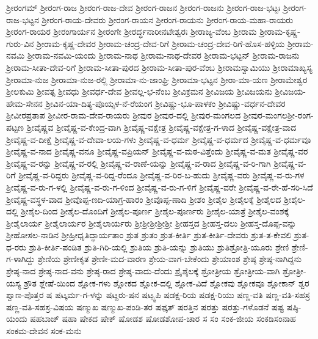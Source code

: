 ಶ್ರೀರಂಗಮ್
ಶ್ರೀರಂಗ-ರಾಜ
ಶ್ರೀರಂಗ-ರಾಜ-ದೇವ
ಶ್ರೀರಂಗ-ರಾಜನ
ಶ್ರೀರಂಗ-ರಾಜನು
ಶ್ರೀರಂಗ-ರಾಜ-ಭಟ್ಟಃ
ಶ್ರೀರಂಗ-ರಾಜ-ಭಟ್ಟನ
ಶ್ರೀರಂಗ-ರಾಯ-ದೇವರು
ಶ್ರೀರಂಗ-ರಾಯನ
ಶ್ರೀರಂಗ-ರಾಯನು
ಶ್ರೀರಂಗ-ರಾಯ-ಮಹಾ-ರಾಯರು
ಶ್ರೀರಂಗ-ರಾಯರ
ಶ್ರೀರಂಗಾರ್ಯನ
ಶ್ರೀರಂಗೇ
ಶ್ರೀರರ್ದ್ಧನಾರೀನಟೇಶ್ವರಃ
ಶ್ರೀರಾಜ್ಯ-ವೆಂಬ
ಶ್ರೀರಾಮ
ಶ್ರೀರಾಮ-ಕೃಷ್ಣ-ಗುರು-ವಿನ
ಶ್ರೀರಾಮ-ಕೃಷ್ಣ-ದೇವರ
ಶ್ರೀರಾಮ-ಚಂದ್ರ-ದೇವ-ರಿಗೆ
ಶ್ರೀರಾಮ-ಚಂದ್ರ-ದೇವ-ರಿಗೆ-ಹೊಸ-ಹಳ್ಳಿಯ
ಶ್ರೀರಾಮ-ನವಮಿ
ಶ್ರೀರಾಮ-ನವಮಿ-ಯಂದು
ಶ್ರೀರಾಮ-ನಾಥ
ಶ್ರೀರಾಮ-ನಾಥ-ದೇವರ
ಶ್ರೀರಾಮ-ಭಟ್ಟನ್
ಶ್ರೀರಾಮ-ರಾಜನು
ಶ್ರೀರಾಮ-ಸೀತಾ-ದೇವ-ರಿಗೆ
ಶ್ರೀರಾಮ-ಸೀತಾ-ಪುರದ
ಶ್ರೀರಾಮ-ಸೀತಾ-ಪುರ-ವೆಂಬ
ಶ್ರೀರಾಮಸ್ವಾಮಿಯು
ಶ್ರೀರಾಮಾಖ್ಯಸ್ಯ
ಶ್ರೀರಾಮಾ-ನುಜ
ಶ್ರೀರಾಮಾ-ನುಜ-ರಲ್ಲಿ
ಶ್ರೀರಾಮಾ-ನು-ಜಾಂಘ್ರಿ
ಶ್ರೀರಾಮಾ-ಭಟ್ಟನ
ಶ್ರೀರಾ-ಮಾ-ಯಣ
ಶ್ರೀರಾಮೇಶ್ವರ
ಶ್ರೀಲಕುಮಿ
ಶ್ರೀವತ್ಸ
ಶ್ರೀವಧು
ಶ್ರೀವರ್ಧ-ದೇವ
ಶ್ರೀವಲ್ಲ-ಭ-ನೆಂಬ
ಶ್ರೀವಿಕ್ರಮನ
ಶ್ರೀವಿಜಯ
ಶ್ರೀವಿಜಯನು
ಶ್ರೀವಿಜಯ-ಹೇಮ-ಸೇನನ
ಶ್ರೀವಿನ-ಯಾ-ದಿತ್ಯ-ಪೊಯ್ಸಳ-ನೆ-ರೆಯಂಗ
ಶ್ರೀವಿಷ್ಣು-ಭೂ-ಪಾಳಕಂ
ಶ್ರೀವಿಷ್ಣು-ವರ್ಧನ-ದೇವರ
ಶ್ರೀವೀರಪ್ರತಾಪ
ಶ್ರೀವೀರ-ರಾಮ-ದೇವ-ರಾಯರು
ಶ್ರೀವುರ
ಶ್ರೀವುರ-ದಲ್ಲಿ
ಶ್ರೀವುರ-ಮಂಗಲದ
ಶ್ರೀವುರ-ಮಂಗಲಶ್ರೀ-ರಂಗ-ಪಟ್ಟಣ
ಶ್ರೀವೈಷ್ಣವ
ಶ್ರೀವೈಷ್ಣ-ವ-ಕೇಂದ್ರ-ವಾಗಿ
ಶ್ರೀವೈಷ್ಣ-ವಕ್ಷೇತ್ರ
ಶ್ರೀವೈಷ್ಣ-ವಕ್ಷೇತ್ರ-ಗ-ಳಾದ
ಶ್ರೀವೈಷ್ಣ-ವಕ್ಷೇತ್ರ-ವಾದ
ಶ್ರೀವೈಷ್ಣ-ವ-ದೀಕ್ಷೆ
ಶ್ರೀವೈಷ್ಣ-ವ-ದೇವಾ-ಲಯ-ಗಳು
ಶ್ರೀವೈಷ್ಣ-ವ-ಧರ್ಮ
ಶ್ರೀವೈಷ್ಣ-ವ-ಧರ್ಮದ
ಶ್ರೀವೈಷ್ಣ-ವ-ಧರ್ಮವೂ
ಶ್ರೀವೈಷ್ಣ-ವ-ನಾದ
ಶ್ರೀವೈಷ್ಣ-ವನೂ
ಶ್ರೀವೈಷ್ಣ-ವಪ್ರಿಯನ್
ಶ್ರೀವೈಷ್ಣ-ವ-ಮಠ-ವಿತ್ತೆಂದು
ಶ್ರೀವೈಷ್ಣ-ವ-ಮತ
ಶ್ರೀವೈಷ್ಣ-ವರ
ಶ್ರೀವೈಷ್ಣ-ವ-ರನ್ನು
ಶ್ರೀವೈಷ್ಣ-ವ-ರಲ್ಲಿ
ಶ್ರೀವೈಷ್ಣ-ವ-ರಾಣೆ-ಯನ್ನು
ಶ್ರೀವೈಷ್ಣ-ವ-ರಾದ
ಶ್ರೀವೈಷ್ಣ-ವ-ರಿ-ಗಾಗಿ
ಶ್ರೀವೈಷ್ಣ-ವ-ರಿಗೆ
ಶ್ರೀವೈಷ್ಣ-ವ-ರಿದ್ದರು
ಶ್ರೀವೈಷ್ಣ-ವ-ರಿದ್ದ-ರೆಂದೂ
ಶ್ರೀವೈಷ್ಣ-ವ-ರಿರ-ಬ-ಹುದು
ಶ್ರೀವೈಷ್ಣ-ವರು
ಶ್ರೀವೈಷ್ಣ-ವ-ರು-ಗಳ
ಶ್ರೀವೈಷ್ಣ-ವ-ರು-ಗ-ಳಲ್ಲಿ
ಶ್ರೀವೈಷ್ಣ-ವ-ರು-ಗ-ಳಿಂದ
ಶ್ರೀವೈಷ್ಣ-ವ-ರು-ಗ-ಳಿಗೆ
ಶ್ರೀವೈಷ್ಣ-ವರೇ
ಶ್ರೀವೈಷ್ಣ-ವ-ರೇ-ಹೆ-ಸರಿ-ಸಿದೆ
ಶ್ರೀವೈಷ್ಣ-ವಸ್ಥಳ-ವಾದ
ಶ್ರೀವೊಪ್ಪ-ಣದಿ-ಯಾಗ್ರ-ಹಾರಂ
ಶ್ರೀವೊಪ್ಪ-ಣಾದಿ
ಶ್ರೀಶಂ
ಶ್ರೀಶೈಲ
ಶ್ರೀಶೈಲಕ್ಕೆ
ಶ್ರೀಶೈಲದ
ಶ್ರೀಶೈಲ-ದಲ್ಲಿ
ಶ್ರೀಶೈಲ-ದಿಂದ
ಶ್ರೀಶೈಲ-ದೊಂದಿಗೆ
ಶ್ರೀಶೈಲ-ಪೂರ್ಣ
ಶ್ರೀಶೈಲ-ಪೂರ್ಣರು
ಶ್ರೀಶೈಲ-ಯಾತ್ರೆ
ಶ್ರೀಶೈಲ-ವಂಶಕ್ಕೆ
ಶ್ರೀಶೈಲಾರ್ಯ
ಶ್ರೀಶೈಲಾರ್ಯರ
ಶ್ರೀಶೈಲಾರ್ಯರು
ಶ್ರೀಶ್ರೀಶ್ರೀಶ್ರೀಶ್ರೀ
ಶ್ರೀಹಸ್ತದ
ಶ್ರೀಹಸ್ತ-ದಲು
ಶ್ರೀಹಸ್ತ-ದೊಪ್ಪ-ವನ್ನು
ಶ್ರೀಹೋಸಲ-ನಾಡಿನ
ಶ್ರೀಹ್ರೀಧೃತಿದ್ಧಾರ್ಯತಾಂ
ಶ್ರುತ
ಶ್ರುತಂ
ಶ್ರುತ-ಕೀರ್ತಿ
ಶ್ರುತ-ಕೀರ್ತಿ-ದೇವರು
ಶ್ರುತ-ತ-ಕೇವಲಿ
ಶ್ರುತ-ಧ-ರರು
ಶ್ರುತಿ-ಕೀರ್ತಿ-ಪಂಡಿತ
ಶ್ರುತಿ-ಗಿರಿ-ಯಲ್ಲಿ
ಶ್ರುತಿಯ
ಶ್ರುತಿ-ಯನ್ನು
ಶ್ರುತಿಯು
ಶ್ರುತಿಶ್ರೋತ್ರಿ-ಯೂರು
ಶ್ರೇಣಿ
ಶ್ರೇಣಿ-ಗ-ಳಾಗಿದ್ದು
ಶ್ರೇಣಿಯ
ಶ್ರೇಣೀಕೃತ
ಶ್ರೇಣೀ-ಮದ-ವಾರಣ
ಶ್ರೇಯ-ವಾಗ-ಬೇಕೆಂದು
ಶ್ರೇಯಾಂಶ
ಶ್ರೇಷ್ಠ
ಶ್ರೇಷ್ಠ-ನಾಗಿದ್ದನು
ಶ್ರೇಷ್ಠ-ನಾದ
ಶ್ರೇಷ್ಠ-ನಾದ-ವನು
ಶ್ರೇಷ್ಠ-ರಾದ
ಶ್ರೇಷ್ಠ-ವಾದು-ದೆಂದು
ಶ್ರೈಶೈಲಕ್ಕೆ
ಶ್ರೋತ್ರೀಯ
ಶ್ರೋತ್ರೀಯ-ವಾಗಿ
ಶ್ರೋತ್ರೀ-ಯಸ್ಯ
ಶ್ರೌತ
ಶ್ಲೇಷೆ-ಯಿಂದ
ಶ್ಲೋಕ-ಗಳು
ಶ್ಲೋಕದ
ಶ್ಲೋಕ-ದಲ್ಲಿ
ಶ್ಲೋಕ-ವಿದೆ
ಶ್ಲೋಕವು
ಶ್ಲೋಕವೂ
ಶ್ಲೋಕಾನ್
ಶ್ವರ
ಶ್ವಾಣ-ಪೊತ್ತರ
ಷ
ಷಟ್ಕರ್ಮ-ಗ-ಳನ್ನು
ಷಟ್ದರು-ಷನ
ಷಟ್ಸ್ವಪಿ
ಷಡಕ್ಷ-ರಿಯ
ಷಡಕ್ಷ-ರಿಯು
ಷಣ್ಣ-ವತಿ
ಷಣ್ಣ-ವತಿ-ಸಹಸ್ರ
ಷಣ್ಣ-ವತಿ-ಸಹಸ್ರ-ವಿಷಯ
ಷಣ್ಮುಖ
ಷಣ್ಮುಖ-ಪಂಡಿ-ತರ
ಷಫ್ಕತ್
ಷರತ್ತಿನ
ಷರತ್ತು
ಷರತ್ತು-ಗಳೊಡನೆ
ಷಷ್ಟ
ಷಷ್ಠಿ-ಯಂದು
ಷಹಬಾಜ್
ಷಹಾ
ಷೇಕದ
ಷೇಕ್
ಷೋಡಶ
ಷೋಡಶೋಪ-ಚಾರ
ಸ
ಸಂ
ಸಂಕ-ಜೀಯ
ಸಂಕಡಿಸಂನಾಹ
ಸಂಕಮ-ದೇವನ
ಸಂಕ-ಮನು
